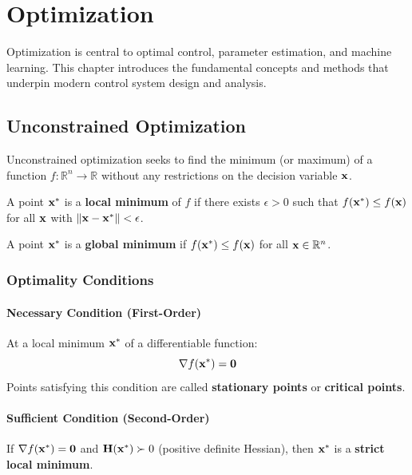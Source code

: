 \chapter{Optimization}
\label{ch:optimization}

Optimization is central to optimal control, parameter estimation, and machine learning. This chapter introduces the fundamental concepts and methods that underpin modern control system design and analysis.

\section{Unconstrained Optimization}

Unconstrained optimization seeks to find the minimum (or maximum) of a function $f: \mathbb{R}^n \to \mathbb{R}$ without any restrictions on the decision variable $\mathbf{x}$.

\begin{definitionbox}[title=Definition: Local and Global Minima]
A point $\mathbf{x}^*$ is a \textbf{local minimum} of $f$ if there exists $\epsilon > 0$ such that $f(\mathbf{x}^*) \leq f(\mathbf{x})$ for all $\mathbf{x}$ with $\|\mathbf{x} - \mathbf{x}^*\| < \epsilon$.

A point $\mathbf{x}^*$ is a \textbf{global minimum} if $f(\mathbf{x}^*) \leq f(\mathbf{x})$ for all $\mathbf{x} \in \mathbb{R}^n$.
\end{definitionbox}

\subsection{Optimality Conditions}

\subsubsection{Necessary Condition (First-Order)}
At a local minimum $\mathbf{x}^*$ of a differentiable function:
\begin{equation}
\nabla f(\mathbf{x}^*) = \mathbf{0}
\end{equation}
Points satisfying this condition are called \textbf{stationary points} or \textbf{critical points}.

\subsubsection{Sufficient Condition (Second-Order)}
If $\nabla f(\mathbf{x}^*) = \mathbf{0}$ and $\mathbf{H}(\mathbf{x}^*) \succ 0$ (positive definite Hessian), then $\mathbf{x}^*$ is a \textbf{strict local minimum}.

